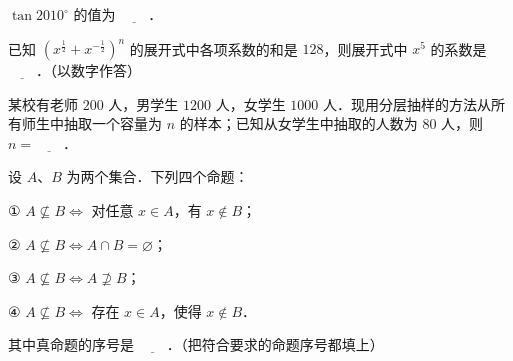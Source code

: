 \begin{question}
$\tan 2010^\circ$ 的值为 $\underline{\quad\quad}$．

\end{question}
\begin{question}
已知 $\left(x^{\frac{1}{2}} + x^{-\frac{1}{2}}\right)^n$ 的展开式中各项系数的和是 $128$，则展开式中 $x^5$ 的系数是 $\underline{\quad\quad}$．（以数字作答）

\end{question}
\begin{question}
某校有老师 $200$ 人，男学生 $1200$ 人，女学生 $1000$ 人．现用分层抽样的方法从所有师生中抽取一个容量为 $n$ 的样本；已知从女学生中抽取的人数为 $80$ 人，则 $n = \underline{\quad\quad}$．

\end{question}
\begin{question}
设 $A$、$B$ 为两个集合．下列四个命题：

① $A \not\subseteq B \iff$ 对任意 $x \in A$，有 $x \notin B$；

② $A \not\subseteq B \iff A \cap B = \varnothing$；

③ $A \not\subseteq B \iff A \not\supseteq B$；

④ $A \not\subseteq B \iff$ 存在 $x \in A$，使得 $x \notin B$．

其中真命题的序号是 $\underline{\quad\quad}$．（把符合要求的命题序号都填上）

\end{question}

